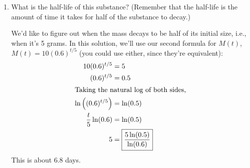 \documentclass[main]{subfiles}
\begin{document}
\begin{enumerate}[resume]
\begin{enumerate}
    \begin{solution}
      The substance decays from 10 grams to 6 grams in 5 days, so what
      happens in 2.5 days?  One way to approach this is to think
      graphically: the substance decays exponentially (shown in red
      below).  If it instead decayed linearly, then it would be 8 grams
      after 2.5 days (shown in blue below):
      \begin{center}
      \end{center}
      As we can see from the graph, the actual mass of the substance is
       after 2.5 days. 
    \end{solution}

  \item
    \begin{problem}[\stretch{0.75}]
      What is the half-life of this substance?  (Remember that the
      half-life is the amount of time it takes for half of the substance
      to decay.)      
    \end{problem}

    \begin{solution}
      We'd like to figure out when the mass decays to be half of its
      initial size, i.e., when it's 5 grams.  In this solution, we'll use
      our second formula for $M(t)$, $M(t) = 10(0.6)^{t / 5}$ (you could
      use either, since they're equivalent):
      \begin{align*}
        10 (0.6)^{t / 5} &= 5 \\
        (0.6)^{t / 5} &= 0.5 \\
        \intertext{Taking the natural log of both sides,}
        \ln \left( (0.6)^{t / 5} \right) &= \ln (0.5) \\
        \frac{t}{5} \ln (0.6) &= \ln (0.5) \\
        5 &= \boxed{ \frac{5 \ln(0.5)}{\ln(0.6)}}
      \end{align*}
      This is about 6.8 days.
    \end{solution}

\pspace{\newpage}


\end{enumerate}
\end{enumerate}
\end{document}
